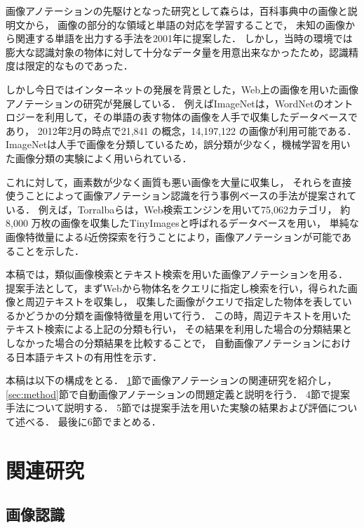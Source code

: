 画像アノテーションの先駆けとなった研究として森ら\cite{mori}は，百科事典中の画像と説明文から，
画像の部分的な領域と単語の対応を学習することで，
未知の画像から関連する単語を出力する手法を2001年に提案した．
しかし，当時の環境では膨大な認識対象の物体に対して十分なデータ量を用意出来なかったため，認識精度は限定的なものであった．

しかし今日ではインターネットの発展を背景とした，Web上の画像を用いた画像アノテーションの研究が発展している．
例えばImageNet\cite{imagenet}は，WordNetのオントロジーを利用して，その単語の表す物体の画像を人手で収集したデータベースであり，
2012年2月の時点で21,841 の概念，14,197,122 の画像が利用可能である．
ImageNetは人手で画像を分類しているため，誤分類が少なく，機械学習を用いた画像分類の実験によく用いられている． 

これに対して，画素数が少なく画質も悪い画像を大量に収集し，
それらを直接使うことによって画像アノテーション認識を行う事例ベースの手法が提案されている．
例えば，Torralba\cite{torralba}らは，Web検索エンジンを用いて75,062カテゴリ，
約8,000 万枚の画像を収集したTinyImagesと呼ばれるデータベースを用い，
単純な画像特徴量による{\it k}近傍探索を行うことにより，画像アノテーションが可能であることを示した．

本稿では，類似画像検索とテキスト検索を用いた画像アノテーションを用る．
提案手法として，まずWebから物体名をクエリに指定し検索を行い，得られた画像と周辺テキストを収集し，
収集した画像がクエリで指定した物体を表しているかどうかの分類を画像特徴量を用いて行う．
この時，周辺テキストを用いたテキスト検索による上記の分類も行い，
その結果を利用した場合の分類結果としなかった場合の分類結果を比較することで，
自動画像アノテーションにおける日本語テキストの有用性を示す．


本稿は以下の構成をとる．
\ref{sec:related}節で画像アノテーションの関連研究を紹介し，
\ref{sec:method}節で自動画像アノテーションの問題定義と説明を行う．
4節で提案手法について説明する．
5節では提案手法を用いた実験の結果および評価について述べる．
最後に6節でまとめる．

\chapter{関連研究}
\label{sec:related}

\section{画像認識}

